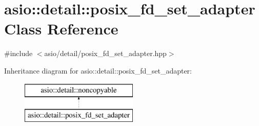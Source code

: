 \hypertarget{classasio_1_1detail_1_1posix__fd__set__adapter}{}\section{asio\+:\+:detail\+:\+:posix\+\_\+fd\+\_\+set\+\_\+adapter Class Reference}
\label{classasio_1_1detail_1_1posix__fd__set__adapter}


{\ttfamily \#include $<$asio/detail/posix\+\_\+fd\+\_\+set\+\_\+adapter.\+hpp$>$}

Inheritance diagram for asio\+:\+:detail\+:\+:posix\+\_\+fd\+\_\+set\+\_\+adapter\+:\begin{figure}[H]
\begin{center}
\leavevmode
\includegraphics[height=2.000000cm]{classasio_1_1detail_1_1posix__fd__set__adapter}
\end{center}
\end{figure}
